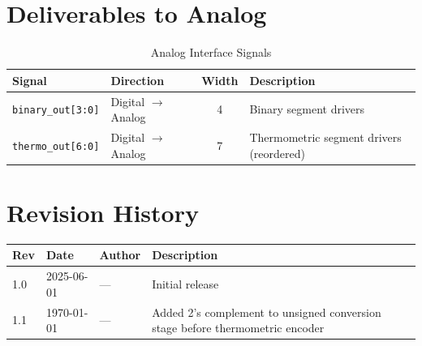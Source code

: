 \documentclass[11pt,a4paper]{article}
\begin{document}
\section{Deliverables to Analog}

\begin{table}[h]
\centering
\begin{tabular}{@{}llcl@{}}
\toprule
\textbf{Signal} & \textbf{Direction} & \textbf{Width} & \textbf{Description} \\
\midrule
\texttt{binary\_out[3:0]} & Digital $\rightarrow$ Analog & 4 & Binary segment drivers \\
\texttt{thermo\_out[6:0]} & Digital $\rightarrow$ Analog & 7 & Thermometric segment drivers (reordered) \\
\bottomrule
\end{tabular}
\caption{Analog Interface Signals}
\end{table}

\section*{Revision History}

\begin{table}[h]
\centering
\begin{tabular}{@{}llll@{}}
\toprule
\textbf{Rev} & \textbf{Date} & \textbf{Author} & \textbf{Description} \\
\midrule
1.0 & 2025-06-01 & --- & Initial release \\
1.1 & \today & --- & Added 2's complement to unsigned conversion stage before thermometric encoder \\
\bottomrule
\end{tabular}
\end{table}
\end{document}
